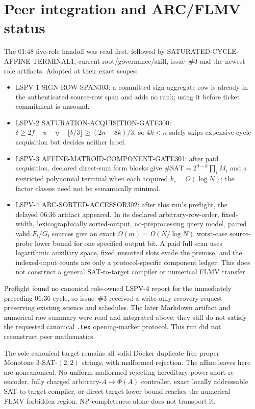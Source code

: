 \documentclass[11pt]{article}
\begin{document}
\section{Peer integration and ARC/FLMV status}
The 01:48 five-role handoff was read first, followed by SATURATED-CYCLE-AFFINE-TERMINAL1, current root/governance/skill, issue~\#3 and the newest role artifacts.  Adopted at their exact scopes:
\begin{itemize}
\item LSPV-1 SIGN-ROW-SPAN303: a committed sign-aggregate row is already in the authenticated source-row span and adds no rank; using it before ticket commitment is unsound.
\item LSPV-2 SATURATION-ACQUISITION-GATE300: $\delta\ge 2f-u-\eta-\lfloor b/3\rfloor\ge(2n-8k)/3$, so $4k<n$ safely skips expensive cycle acquisition but decides neither label.
\item LSPV-3 AFFINE-MATROID-COMPONENT-GATE301: after paid acquisition, declared direct-sum form blocks give $\#\mathrm{SAT}=2^{d-h}\prod_i M_i$ and a restricted polynomial terminal when each acquired $h_i=O(\log N)$; the factor classes need not be semantically minimal.
\item LSPV-4 ARC-SORTED-ACCESSOR302: after this run's preflight, the delayed 06:36 artifact appeared. In its declared arbitrary-row-order, fixed-width, lexicographically sorted-output, no-preprocessing query model, paired valid $F_t/G_t$ sources give an exact $\Omega(m)=\Omega(N/\log N)$ worst-case source-probe lower bound for one specified output bit. A paid full scan uses logarithmic auxiliary space, fixed unsorted slots evade the premise, and the indexed-input counts are only a protocol-specific component ledger. This does not construct a general SAT-to-target compiler or numerical FLMV transfer.
\end{itemize}

Preflight found no canonical role-owned LSPV-4 report for the immediately preceding 06:36 cycle, so issue~\#3 received a write-only recovery request preserving existing science and schedules. The later Markdown artifact and numerical raw summary were read and integrated above; they still do not satisfy the requested canonical \texttt{.tex} opening-marker protocol. This run did not reconstruct peer mathematics.

The sole canonical target remains all valid D\"ocker duplicate-free proper Monotone 3-SAT-$(2,2)$ strings, with malformed rejection.  The affine leaves here are noncanonical.  No uniform malformed-rejecting hereditary power-short re-encoder, fully charged arbitrary-$A\mapsto\Phi(A)$ controller, exact locally addressable SAT-to-target compiler, or direct target lower bound reaches the numerical FLMV forbidden region.  NP-completeness alone does not transport it.
\end{document}
